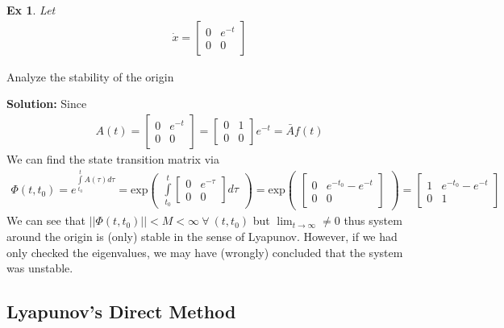 \documentclass[twoside]{article}
\newtheorem{exmp}[theorem]{Ex}
\begin{document}
\begin{exmp}
 Let 
 \begin{align*}
  \dot{x} = \begin{bmatrix} 0 & e^{-t}  \\ 0 & 0 \end{bmatrix}
 \end{align*}
\end{exmp}
Analyze the stability of the origin 

\textbf{Solution:} Since 
\begin{align*}
  A(t) = \begin{bmatrix} 0 & e^{-t}  \\ 0 & 0 \end{bmatrix} =
  \begin{bmatrix} 0 & 1 \\ 0 & 0 \end{bmatrix} e^{-t} = \bar{A} f(t)
 \end{align*}
%
We can find the state transition matrix via
\begin{align*}
\Phi(t,t_0) = e^{\int\limits_{t_0}^t A(\tau) d\tau} = 
  \mathrm{exp} \begin{pmatrix}
      \int\limits_{t_0}^t \begin{bmatrix} 0 & e^{-\tau}  \\ 0 & 0 \end{bmatrix} d\tau
  \end{pmatrix}
  =  \mathrm{exp} \begin{pmatrix}  \begin{bmatrix} 0 & e^{-t_0} - e^{-t}  \\ 0 & 0 \end{bmatrix} 
  \end{pmatrix}
  = \begin{bmatrix} 1 & e^{-t_0} - e^{-t}  \\ 0 & 1 \end{bmatrix} 
\end{align*}
%
We can see that $ || \Phi(t,t_0) || < M < \infty \ \forall \ (t,t_0)$ but $\lim_{t\to\infty} \neq 0$
thus system around the origin is (only) stable in the sense of Lyapunov. However, if we had only 
checked the eigenvalues, we may have (wrongly) concluded that the system was unstable. 

\subsection{Lyapunov's Direct Method}
\end{document}
